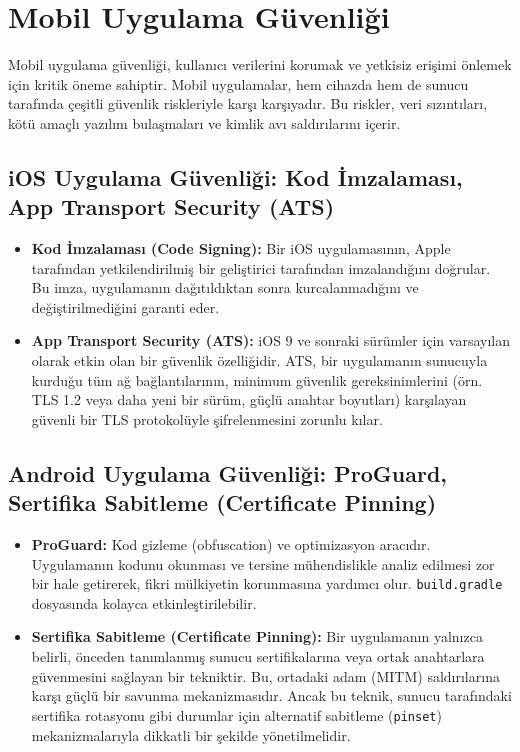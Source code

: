 \section{Mobil Uygulama Güvenliği}

Mobil uygulama güvenliği, kullanıcı verilerini korumak ve yetkisiz erişimi önlemek için kritik öneme sahiptir. Mobil uygulamalar, hem cihazda hem de sunucu tarafında çeşitli güvenlik riskleriyle karşı karşıyadır. Bu riskler, veri sızıntıları, kötü amaçlı yazılım bulaşmaları ve kimlik avı saldırılarını içerir.

\subsection{iOS Uygulama Güvenliği: Kod İmzalaması, App Transport Security (ATS)}

\begin{itemize}
\item \textbf{Kod İmzalaması (Code Signing):} Bir iOS uygulamasının, Apple tarafından yetkilendirilmiş bir geliştirici tarafından imzalandığını doğrular. Bu imza, uygulamanın dağıtıldıktan sonra kurcalanmadığını ve değiştirilmediğini garanti eder.
\item \textbf{App Transport Security (ATS):} iOS 9 ve sonraki sürümler için varsayılan olarak etkin olan bir güvenlik özelliğidir. ATS, bir uygulamanın sunucuyla kurduğu tüm ağ bağlantılarının, minimum güvenlik gereksinimlerini (örn. TLS 1.2 veya daha yeni bir sürüm, güçlü anahtar boyutları) karşılayan güvenli bir TLS protokolüyle şifrelenmesini zorunlu kılar.
\end{itemize}
\subsection{Android Uygulama Güvenliği: ProGuard, Sertifika Sabitleme (Certificate Pinning)}
\begin{itemize}
\item \textbf{ProGuard:} Kod gizleme (obfuscation) ve optimizasyon aracıdır. Uygulamanın kodunu okunması ve tersine mühendislikle analiz edilmesi zor bir hale getirerek, fikri mülkiyetin korunmasına yardımcı olur. \texttt{build.gradle} dosyasında kolayca etkinleştirilebilir.
\item \textbf{Sertifika Sabitleme (Certificate Pinning):} Bir uygulamanın yalnızca belirli, önceden tanımlanmış sunucu sertifikalarına veya ortak anahtarlara güvenmesini sağlayan bir tekniktir. Bu, ortadaki adam (MITM) saldırılarına karşı güçlü bir savunma mekanizmasıdır. Ancak bu teknik, sunucu tarafındaki sertifika rotasyonu gibi durumlar için alternatif sabitleme (\texttt{pinset}) mekanizmalarıyla dikkatli bir şekilde yönetilmelidir.
\end{itemize}

